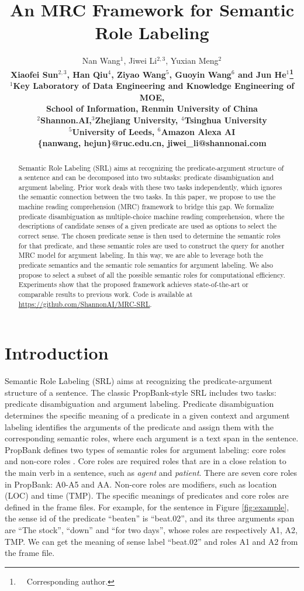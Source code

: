 \documentclass[11pt]{article}
\title{An MRC Framework for Semantic Role Labeling}
\author{
Nan Wang$^{1}$, Jiwei Li$^{2,3}$, Yuxian Meng$^{2}$\\
\bf Xiaofei Sun$^{2,3}$, Han Qiu$^{4}$, Ziyao Wang$^{5}$, Guoyin Wang$^{6}$ and Jun He$^{1}$\thanks{~~Corresponding author.} \\
$^1$Key Laboratory of Data Engineering and Knowledge Engineering of MOE, \\
School of Information, Renmin University of China\\
$^2$Shannon.AI,$^3$Zhejiang University, $^{4}$Tsinghua University \\
$^{5}$University of Leeds, $^{6}$Amazon Alexa AI \\
\{nanwang, hejun\}@ruc.edu.cn, jiwei\_li@shannonai.com
}
\begin{document}
\maketitle
\begin{abstract}
Semantic Role Labeling (SRL) aims at recognizing the predicate-argument structure of a sentence and can be decomposed into two subtasks: predicate disambiguation and argument labeling. 
Prior work deals with these two tasks independently, which ignores the semantic connection between the two tasks.
In this paper, we propose to use the machine reading comprehension (MRC) framework to bridge this gap.
We formalize predicate disambiguation as multiple-choice machine reading comprehension, where the descriptions of candidate senses of a given predicate are used as options to select the correct sense.
The chosen predicate sense is then used to determine the semantic roles for that predicate, and these semantic roles are used to construct the query for another MRC model for argument labeling.
In this way, we are able to leverage both the predicate semantics and the semantic role semantics for argument labeling.
We also propose to select a subset of all the possible semantic roles for computational efficiency.
Experiments show that the proposed framework achieves state-of-the-art or comparable results to previous work.
Code is available at \url{https://github.com/ShannonAI/MRC-SRL}.
\end{abstract}

\section{Introduction}
Semantic Role Labeling (SRL) aims at recognizing the predicate-argument structure of a sentence.  
The classic PropBank-style SRL includes two tasks: predicate disambiguation and argument labeling.
Predicate disambiguation determines the specific meaning of a predicate in a given context and argument labeling identifies the arguments of the predicate and assign them with the corresponding semantic roles, where each argument is a text span in the sentence.
PropBank defines two types of semantic roles for argument labeling: core roles and non-core roles \cite{bonial2010propbank}. Core roles are required roles that are in a close relation to the main verb in a sentence, such as {\it agent} and {\it patient}. 
There are seven core roles in PropBank: A0-A5 and AA.
Non-core roles are modifiers, such as location (LOC) and time (TMP). The specific meanings of predicates and core roles are defined in the frame files.
For example, for the sentence in Figure  \ref{fig:example}, the sense id of the predicate ``beaten'' is ``beat.02'', and its three arguments span are “The stock”, “down” and “for two days”, whose roles are respectively A1, A2, TMP.
We can get the meaning of sense label ``beat.02'' and roles A1 and A2 from the frame file.
\end{document}
